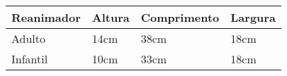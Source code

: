 \begin{table}[h]
\begin{tabular}{|l|l|l|l|}
\hline
\multicolumn{1}{|c|}{Reanimador} & Altura & Comprimento & Largura \\ \hline
Adulto                           & 14cm   & 38cm        & 18cm    \\ \hline
Infantil                         & 10cm   & 33cm        & 18cm    \\ \hline
\end{tabular}
\end{table}


